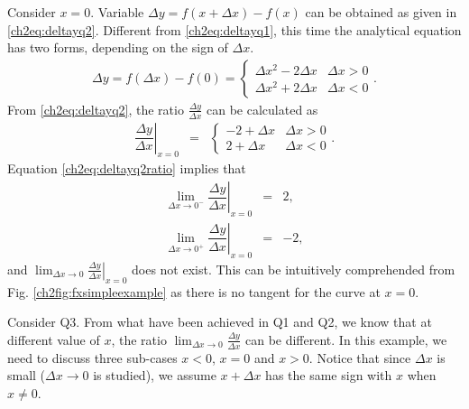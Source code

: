 Consider $x=0$. Variable $\Delta y = f\left(x+\Delta x\right) - f(x)$ can be obtained as given in \eqref{ch2eq:deltayq2}. Different from \eqref{ch2eq:deltayq1}, this time the analytical equation has two forms, depending on the sign of $\Delta x$.
\begin{eqnarray}
  \Delta y = f\left(\Delta x\right) - f(0) = \left\{\begin{array}{cc}
                                                      \Delta x^2 - 2\Delta x & \Delta x > 0 \\
                                                      \Delta x^2 + 2\Delta x & \Delta x < 0
                                                    \end{array}\right.. \label{ch2eq:deltayq2}
\end{eqnarray}
From \eqref{ch2eq:deltayq2}, the ratio $\frac{\Delta y}{\Delta x}$ can be calculated as
\begin{eqnarray}
  \left.\dfrac{\Delta y}{\Delta x}\right|_{x=0} &=& \left\{\begin{array}{cc}
                                          -2 + \Delta x & \Delta x > 0 \\
                                          2 + \Delta x & \Delta x < 0
                                        \end{array}\right.. \label{ch2eq:deltayq2ratio}
\end{eqnarray}
Equation \eqref{ch2eq:deltayq2ratio} implies that
\begin{eqnarray}
  \lim_{\Delta x\rightarrow 0^-} \left.\dfrac{\Delta y}{\Delta x}\right|_{x=0} &=& 2, \nonumber \\
  \lim_{\Delta x\rightarrow 0^+} \left.\dfrac{\Delta y}{\Delta x}\right|_{x=0} &=& -2, \nonumber
\end{eqnarray}
and $\lim_{\Delta x\rightarrow 0}\left.\frac{\Delta y}{\Delta x}\right|_{x=0}$ does not exist. This can be intuitively comprehended from Fig. \ref{ch2fig:fxsimpleexample} as there is no tangent for the curve at $x=0$.

Consider Q3. From what have been achieved in Q1 and Q2, we know that at different value of $x$, the ratio $\lim_{\Delta x\rightarrow 0}\frac{\Delta y}{\Delta x}$ can be different. In this example, we need to discuss three sub-cases $x<0$, $x=0$ and $x>0$. Notice that since $\Delta x$ is small ($\Delta x \rightarrow 0$ is studied), we assume $x + \Delta x$ has the same sign with $x$ when $x\neq 0$.

